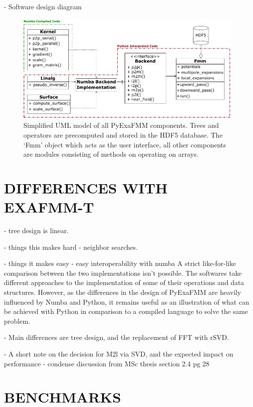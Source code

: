 \documentclass{IEEEcsmag}
\begin{document}
- Software design diagram

\begin{figure}
    \centerline{\includegraphics {figures/software.pdf}}
    \caption{Simplified UML model of all PyExaFMM components. Trees and operators are precomputed and stored in the HDF5 database. The `Fmm' object which acts as the user interface, all other components are modules consisting of methods on operating on arrays.}
    \label{fig:design}
\end{figure}

\section{DIFFERENCES WITH EXAFMM-T}

- tree design is linear. 

- things this makes hard - neighbor searches.

- things it makes easy - easy interoperability with numba
A strict like-for-like comparison between the two implementations isn't possible. The softwares take different approaches to the implementation of some of their operations and data structures. However, as the differences in the design of PyExaFMM are heavily influenced by Numba and Python, it remains useful as an illustration of what can be achieved with Python in comparison to a compiled language to solve the same problem.

- Main differences are tree design, and the replacement of FFT with rSVD.

- A short note on the decision for M2l via SVD, and the expected impact on performance - condense discussion from MSc thesis section 2.4 pg 28

\section{BENCHMARKS}
\end{document}
